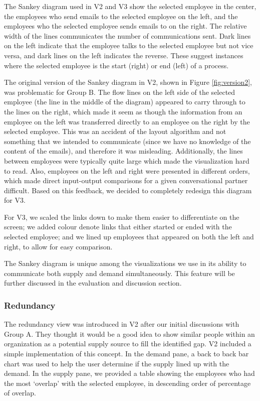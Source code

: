 \documentclass[journal]{vgtc}                %
\begin{document}
The Sankey diagram used in V2 and V3 show the selected employee in the center, the employees who send emails to the selected employee on the left, and the employees who the selected employee sends emails to on the right. The relative width of the lines communicates the number of communications sent. Dark lines on the left indicate that the employee talks to the selected employee but not vice versa, and dark lines on the left indicates the reverse. These suggest instances where the selected employee is the start (right) or end (left) of a process. 

The original version of the Sankey diagram in V2, shown in Figure \ref{fig:version2}, was problematic for Group B. The flow lines on the left side of the selected employee (the line in the middle of the diagram) appeared to carry through to the lines on the right, which made it seem as though the information from an employee on the left was transferred directly to an employee on the right by the selected employee. This was an accident of the layout algorithm and not something that we intended to communicate (since we have no knowledge of the content of the emails), and therefore it was misleading. Additionally, the lines between employees were typically quite large which made the visualization hard to read. Also, employees on the left and right were presented in different orders, which made direct input-output comparisons for a given conversational partner difficult. Based on this feedback, we decided to completely redesign this diagram for V3.

For V3, we scaled the links down to make them easier to differentiate on the screen; we added colour denote links that either started or ended with the selected employee; and we lined up employees that appeared on both the left and right, to allow for easy comparison.

The Sankey diagram is unique among the visualizations we use in its ability to communicate both supply and demand simultaneously. This feature will be further discussed in the evaluation and discussion section.

\subsubsection{Redundancy}

The redundancy view was introduced in V2 after our initial discussions with Group A.  They thought it would be a good idea to show similar people within an organization as a potential supply source to fill the identified gap. V2 included a simple implementation of this concept. In the demand pane, a back to back bar chart was used to help the user determine if the supply lined up with the demand. In the supply pane, we provided a table showing the employees who had the most \lq overlap\rq{} with the selected employee, in descending order of percentage of overlap.
\end{document}
